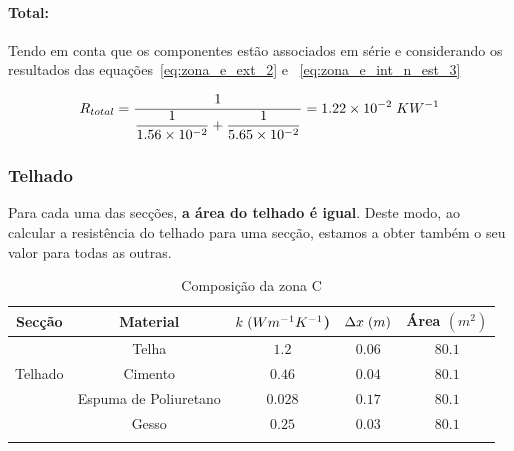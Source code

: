 \documentclass[12pt, a4paper]{article}
\begin{document}
\paragraph{Total:}\label{par:zona_e_total:} Tendo em conta que os componentes est\~ao
associados em série e considerando os resultados das
equa\c{c}\~oes~\ref{eq:zona_e_ext_2} e ~\ref{eq:zona_e_int_n_est_3}

\begin{equation}
	R_{total} =
	\dfrac{1}{
		\dfrac{1}{
			1.56 \times 10^{-2} 
		}	+ 
		\dfrac{1}{	
			5.65 \times 10^{-2} 
		}	
	}		
	= 1.22 \times 10^{-2} \hspace{1mm} KW^{-1}
	\label{eq:zona_e_total}
\end{equation}



\subsubsection{Telhado}\label{ssub:Telhado}

Para cada uma das secções, \textbf{a área do telhado é igual}. Deste modo, ao calcular a resistência do telhado
para uma secção, estamos a obter também o seu valor para todas as outras.
\begin{table}[htpb]
	\begin{center}
		\begin{tabular}{c c c c c}
			\toprule{}
			Secção                     & Material               & $ k \hspace{1mm} (Wm^{-1}K^{-1}$) & $ \Delta x \hspace{1mm} (m)$ & Área $(m^2) $ \\
				\midrule{}

			\multirow{5}{*}{}          & Telha                  & $1.2$                             & $0.06$                       & $80.1$        \\
				\cline{2-5}
			Telhado                    & Cimento				& $0.46$                            & $0.04$                       & $80.1$        \\
				\cline{2-5}
			                           & Espuma de Poliuretano  & $0.028$                           & $0.17$                       & $80.1$        \\
				\cline{2-5}
									   & Gesso				 	& $0.25$                            & $0.03$                       & $80.1$        \\
			\bottomrule{}
		\end{tabular}
	\end{center}
	\caption{Composição da zona C}\label{tab:telhado}
\end{table}
\end{document}
